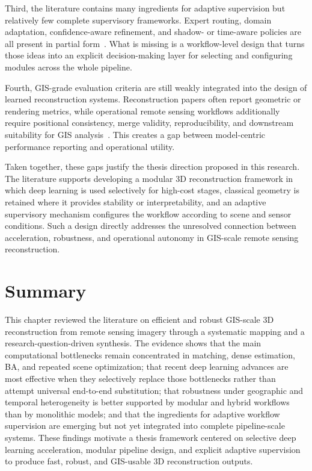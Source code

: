 Third, the literature contains many ingredients for adaptive supervision but relatively few complete supervisory frameworks. Expert routing, domain adaptation, confidence-aware refinement, and shadow- or time-aware policies are all present in partial form~\cite{SMoEStereo2025,MoE3D2026,FoundationStereo2025,Masquil2026}. What is missing is a workflow-level design that turns those ideas into an explicit decision-making layer for selecting and configuring modules across the whole pipeline.

Fourth, GIS-grade evaluation criteria are still weakly integrated into the design of learned reconstruction systems. Reconstruction papers often report geometric or rendering metrics, while operational remote sensing workflows additionally require positional consistency, merge validity, reproducibility, and downstream suitability for GIS analysis~\cite{deFranchis2014,Elias2025,Zhou2026}. This creates a gap between model-centric performance reporting and operational utility.

Taken together, these gaps justify the thesis direction proposed in this research. The literature supports developing a modular 3D reconstruction framework in which deep learning is used selectively for high-cost stages, classical geometry is retained where it provides stability or interpretability, and an adaptive supervisory mechanism configures the workflow according to scene and sensor conditions. Such a design directly addresses the unresolved connection between acceleration, robustness, and operational autonomy in GIS-scale remote sensing reconstruction.

\section{Summary}

This chapter reviewed the literature on efficient and robust GIS-scale 3D reconstruction from remote sensing imagery through a systematic mapping and a research-question-driven synthesis. The evidence shows that the main computational bottlenecks remain concentrated in matching, dense estimation, BA, and repeated scene optimization; that recent deep learning advances are most effective when they selectively replace those bottlenecks rather than attempt universal end-to-end substitution; that robustness under geographic and temporal heterogeneity is better supported by modular and hybrid workflows than by monolithic models; and that the ingredients for adaptive workflow supervision are emerging but not yet integrated into complete pipeline-scale systems. These findings motivate a thesis framework centered on selective deep learning acceleration, modular pipeline design, and explicit adaptive supervision to produce fast, robust, and GIS-usable 3D reconstruction outputs.
